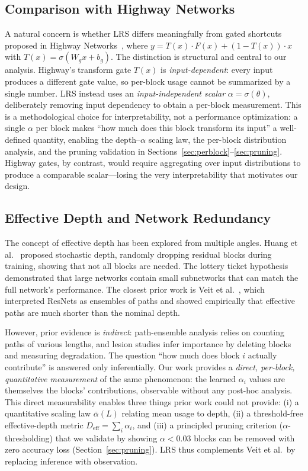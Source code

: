 \documentclass[preprint,12pt]{elsarticle}
\begin{document}
\subsection{Comparison with Highway Networks}

A natural concern is whether LRS differs meaningfully from gated shortcuts proposed in Highway Networks~\cite{srivastava2015highway}, where $y = T(x)\cdot F(x) + (1 - T(x))\cdot x$ with $T(x) = \sigma(W_g x + b_g)$. The distinction is structural and central to our analysis. Highway's transform gate $T(x)$ is \emph{input-dependent}: every input produces a different gate value, so per-block usage cannot be summarized by a single number. LRS instead uses an \emph{input-independent scalar} $\alpha = \sigma(\theta)$, deliberately removing input dependency to obtain a per-block measurement. This is a methodological choice for interpretability, not a performance optimization: a single $\alpha$ per block makes ``how much does this block transform its input'' a well-defined quantity, enabling the depth--$\alpha$ scaling law, the per-block distribution analysis, and the pruning validation in Sections~\ref{sec:perblock}--\ref{sec:pruning}. Highway gates, by contrast, would require aggregating over input distributions to produce a comparable scalar---losing the very interpretability that motivates our design.

\subsection{Effective Depth and Network Redundancy}

The concept of effective depth has been explored from multiple angles. Huang et al.~\cite{huang2016deep} proposed stochastic depth, randomly dropping residual blocks during training, showing that not all blocks are needed. The lottery ticket hypothesis~\cite{frankle2019lottery} demonstrated that large networks contain small subnetworks that can match the full network's performance. The closest prior work is Veit et al.~\cite{veit2016residual}, which interpreted ResNets as ensembles of paths and showed empirically that effective paths are much shorter than the nominal depth.

However, prior evidence is \emph{indirect}: path-ensemble analysis relies on counting paths of various lengths, and lesion studies infer importance by deleting blocks and measuring degradation. The question ``how much does block $i$ actually contribute'' is answered only inferentially.  Our work provides a \emph{direct, per-block, quantitative measurement} of the same phenomenon: the learned $\alpha_i$ values are themselves the blocks' contributions, observable without any post-hoc analysis. This direct measurability enables three things prior work could not provide: (i) a quantitative scaling law $\bar{\alpha}(L)$ relating mean usage to depth, (ii) a threshold-free effective-depth metric $D_\text{eff} = \sum_i \alpha_i$, and (iii) a principled pruning criterion ($\alpha$-thresholding) that we validate by showing $\alpha < 0.03$ blocks can be removed with zero accuracy loss (Section~\ref{sec:pruning}). LRS thus complements Veit et al.\ by replacing inference with observation.
\end{document}
